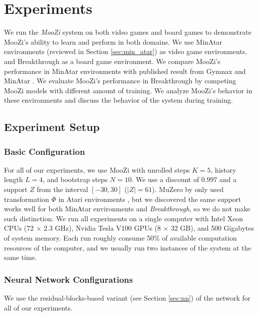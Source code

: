 \chapter{Experiments}
\label{sec:exp}
We run the \textit{MooZi} system on both video games and board games to demonstrate MooZi's ability to learn and perform in both domains.
We use MinAtar environments (reviewed in Section \ref{sec:min_atar}) as video game environments, and Breakthrough as a board game environment.
We compare MooZi's performance in MinAtar environments with published result from Gymnax \cite{GymnaxJAXbasedReinforcement_RobertTjarkoLange_2022} and MinAtar \cite{MinAtarAtariInspiredTestbed_Young.Tian_2019}.
We evaluate MooZi's performance in Breakthrough by competing MooZi models with different amount of training.
We analyze MooZi's behavior in these environments and discuss the behavior of the system during training.

\section{Experiment Setup}
\subsection{Basic Configuration}
For all of our experiments, we use MooZi with unrolled steps $K = 5$, history length $L = 4$, and bootstrap steps $N = 10$.
We use a discount of $0.997$ and a support $Z$ from the interval  $[-30, 30]$ ($|Z| = 61$).
MuZero by \citeauthor{MasteringAtariGo_Schrittwieser.Antonoglou.ea_2020} only used transformation $\Phi$ in Atari environments \cite{MasteringAtariGo_Schrittwieser.Antonoglou.ea_2020}, but we discovered the same support works well for both MinAtar environments and \textit{Breakthrough}, so we do not make such distinction.
We run all experiments on a single computer with Intel Xeon CPUs (72 $\times$ 2.3 GHz), Nvidia Tesla V100 GPUs (8 $\times$ 32 GB), and 500 Gigabytes of system memory.
Each run roughly consume 50\% of available computation resources of the computer, and we usually run two instances of the system at the same time.

\subsection{Neural Network Configurations}
We use the residual-blocks-based variant (see Section \ref{sec:nn}) of the network for all of our experiments.

